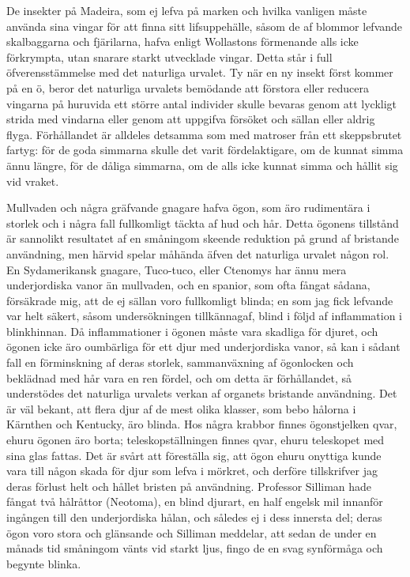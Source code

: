 De insekter på Madeira, som ej lefva på marken och hvilka vanligen måste använda sina vingar för att finna sitt lifsuppehälle, såsom de af blommor lefvande skalbaggarna och fjärilarna, hafva enligt Wollastons förmenande alls icke förkrympta, utan snarare starkt utvecklade vingar. Detta står i full öfverensstämmelse med det naturliga urvalet. Ty när en ny insekt först kommer på en ö, beror det naturliga urvalets bemödande att förstora eller reducera vingarna på huruvida ett större antal individer skulle bevaras genom att lyckligt strida med vindarna eller genom att uppgifva försöket och sällan eller aldrig flyga. Förhållandet är alldeles detsamma som med matroser från ett skeppsbrutet fartyg: för de goda simmarna skulle det varit fördelaktigare, om de kunnat simma ännu längre, för de dåliga simmarna, om de alls icke kunnat simma och hållit sig vid vraket.

Mullvaden och några gräfvande gnagare hafva ögon, som äro rudimentära i storlek och i några fall fullkomligt täckta af hud och hår. Detta ögonens tillstånd är sannolikt resultatet af en småningom skeende reduktion på grund af bristande användning, men härvid spelar måhända äfven det naturliga urvalet någon rol. En Sydamerikansk gnagare, Tuco-tuco, eller Ctenomys har ännu mera underjordiska vanor än mullvaden, och en spanior, som ofta fångat sådana, försäkrade mig, att de ej sällan voro fullkomligt blinda; en som jag fick lefvande var helt säkert, såsom undersökningen tillkännagaf, blind i följd af inflammation i blinkhinnan. Då inflammationer i ögonen måste vara skadliga för djuret, och ögonen icke äro oumbärliga för ett djur med underjordiska vanor, så kan i sådant fall en förminskning af deras storlek, sammanväxning af ögonlocken och beklädnad med hår vara en ren fördel, och om detta är förhållandet, så understödes det naturliga urvalets verkan af organets bristande användning.
Det är väl bekant, att flera djur af de mest olika klasser, som bebo hålorna i Kärnthen och Kentucky, äro blinda. Hos några krabbor finnes ögonstjelken qvar, ehuru ögonen äro borta; teleskopställningen finnes qvar, ehuru teleskopet med sina glas fattas. Det är svårt att föreställa sig, att ögon ehuru onyttiga kunde vara till någon skada för djur som lefva i mörkret, och derföre tillskrifver jag deras förlust helt och hållet bristen på användning. Professor Silliman hade fångat två hålråttor (Neotoma), en blind djurart, en half engelsk mil innanför ingången till den underjordiska hålan, och således ej i dess innersta del; deras ögon voro stora och glänsande och Silliman meddelar, att sedan de under en månads tid småningom vänts vid starkt ljus, fingo de en svag synförmåga och begynte blinka.

